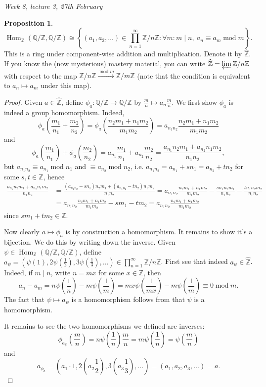 \documentclass{article}
\newcommand{\Z}{\mathbb{Z}}
\newcommand{\Q}{\mathbb{Q}}
\newcommand{\Hom}{\operatorname{Hom}}
\newcommand{\Mod}{\operatorname{mod}}
\newcommand{\zhat}{\widehat{\Z}}
\theoremstyle{definition}
\newtheorem{prop}[defn]{Proposition}
\begin{document}
\begin{flushright}
\textit{Week 8, lecture 3, 27th February}
\end{flushright}

\begin{prop}
\[
\Hom_\Z(\Q/\Z,\Q/\Z)\cong\left\{(a_1,a_2,\ldots)\in\prod_{n=1}^\infty\Z/n\Z:\forall m:m\mid n,\ a_n\equiv a_m\Mod m\right\}.
\]
This is a ring under component-wise addition and multiplication. Denote it by $\zhat$. If you know the (now mysterious) mastery material, you can write $\zhat=\varprojlim \Z/n\Z$ with respect to the map $\Z/n\Z\xrightarrow{\Mod m}\Z/m\Z$ (note that the condition is equivalent to $a_n\mapsto a_m$ under this map).
\end{prop}
\begin{proof}
Given $a\in\zhat$, define $\phi_a:\Q/\Z\rightarrow\Q/\Z$ by $\frac{m}{n}\mapsto a_n\frac{m}{n}$. We first show $\phi_a$ is indeed a group homomorphism. Indeed,
\[
\phi_a\left(\frac{m_1}{n_1}+\frac{m_2}{n_2}\right)=\phi_a\left(\frac{n_2m_1+n_1m_2}{m_1m_2}\right)=a_{n_1n_2}\frac{n_2m_1+n_1m_2}{m_1m_2}
\]
and
\[
\phi_a\left(\frac{m_1}{n_1}\right)+\phi_a\left(\frac{m_2}{n_2}\right)=a_{n_1}\frac{m_1}{n_1}+a_{n_2}\frac{m_2}{n_2}=\frac{a_{n_1}n_2m_1+a_{n_2}n_1m_2}{n_1n_2},
\]
but $a_{n_1n_2}\equiv a_{n_1}\Mod n_1$ and $\equiv a_{n_2}\Mod n_2$, i.e. $a_{n_1n_2}=a_{n_1}+sn_1=a_{n_2}+tn_2$ for some $s,t\in\Z$, hence
\[
\begin{aligned}
\frac{a_{n_1}n_2m_1+a_{n_2}n_1m_2}{n_1n_2}&=\frac{(a_{n_1n_2}-sn_1)n_2m_1+(a_{n_1n_2}-tn_2)n_1m_2}{n_1n_2}=a_{n_1n_2}\frac{n_2m_1+n_1m_2}{m_1m_2}-\frac{sn_1n_2m_1}{n_1n_2}-\frac{tn_1n_2m_2}{n_1n_2}\\
&=a_{n_1n_2}\frac{n_2m_1+n_1m_2}{m_1m_2}-sm_1-tm_2=a_{n_1n_2}\frac{n_2m_1+n_1m_2}{m_1m_2}
\end{aligned}
\]
since $sm_1+tm_2\in\Z$.

Now clearly $a\mapsto\phi_a$ is by construction a homomorphism. It remains to show it's a bijection. We do this by writing down the inverse. Given $\psi\in\Hom_\Z(\Q/\Z,\Q/\Z)$, define $a_\psi=\left(\psi(1),2\psi\left(\frac12\right),3\psi\left(\frac13\right),\ldots\right)\in\prod_{n=1}^\infty\Z/n\Z$. First see that indeed $a_\psi\in\zhat$. Indeed, if $m\mid n$, write $n=mx$ for some $x\in\Z$, then
\[
a_n-a_m=n\psi\left(\frac1n\right)-m\psi\left(\frac1m\right)=mx\psi\left(\frac{1}{mx}\right)-m\psi\left(\frac1m\right)\equiv 0\Mod m .
\]
The fact that $\psi\mapsto a_\psi$ is a homomorphism follows from that $\psi$ is a homomorphism.

It remains to see the two homomorphisms we defined are inverses:
\[
\phi_{a_\psi}\left(\frac{m}{n}\right)=n\psi\left(\frac1n\right)\frac{m}{n}=m\psi\left(\frac1n\right)=\psi\left(\frac{m}{n}\right)
\]
and
\[
a_{\phi_a}=\left(a_1\cdot 1,2\left(a_2\frac12\right),3\left(a_3\frac13\right),\ldots\right)=(a_1,a_2,a_3,\ldots)=a.
\]
\end{proof}
\end{document}
